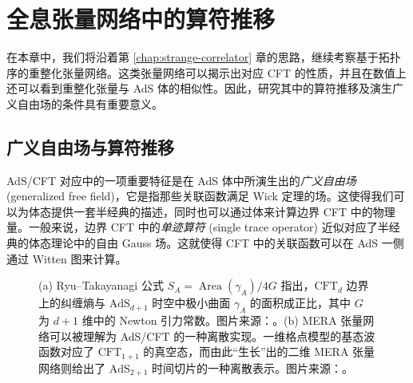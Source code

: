 \chapter{全息张量网络中的算符推移}
\label{chap:operator-pushing}

在本章中，我们将沿着第 \ref{chap:strange-correlator} 章的思路，继续考察基于拓扑序的重整化张量网络。这类张量网络可以揭示出对应 CFT 的性质，并且在数值上还可以看到重整化张量与 AdS 体的相似性。因此，研究其中的算符推移及演生广义自由场的条件具有重要意义。

\section{广义自由场与算符推移}

AdS/CFT 对应\cite{maldacena1999large}中的一项重要特征是在 AdS 体中所演生出的\emph{广义自由场} (generalized free field)，它是指那些关联函数满足 Wick 定理的场\cite{dutsch2003generalized,liu2019dimensional,collier2019quantum,nebabu2023bulk}。这使得我们可以为体态提供一套半经典的描述，同时也可以通过体来计算边界 CFT 中的物理量。一般来说，边界 CFT 中的\emph{单迹算符} (single trace operator) 近似对应了半经典的体态理论中的自由 Gauss 场。这就使得 CFT 中的关联函数可以在 AdS 一侧通过 Witten 图来计算\cite{witten1998anti,gubser1998gauge}。

\begin{figure}[htb]
  \centering
   \qquad
  \caption[全息张量网络与 AdS/CFT 对应]{(a) Ryu--Takayanagi 公式 $S_A=\operatorname{Area}(\gamma_A)/4G$ 指出，$\text{CFT}_d$ 边界上的纠缠熵与 $\text{AdS}_{d+1}$ 时空中极小曲面 $\gamma_A$ 的面积成正比，其中 $G$ 为 $d+1$ 维中的 Newton 引力常数。图片来源：\parencite{nishioka2009holographic}。(b) MERA 张量网络可以被理解为 AdS/CFT 的一种离散实现。一维格点模型的基态波函数对应了 $\text{CFT}_{1+1}$ 的真空态，而由此“生长”出的二维 MERA 张量网络则给出了 $\text{AdS}_{2+1}$ 时间切片的一种离散表示。图片来源：\parencite{evenbly2011tensor}。}
\end{figure}

